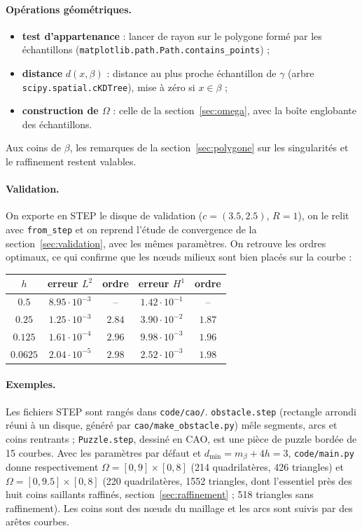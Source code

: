 \documentclass[11pt,a4paper]{article}
\begin{document}
\paragraph{Opérations géométriques.}
\begin{itemize}
  \item \textbf{test d'appartenance} : lancer de rayon sur le polygone formé
        par les échantillons (\texttt{matplotlib.path.Path.contains\_points}) ;
  \item \textbf{distance} $d(x, \beta)$ : distance au plus proche
        échantillon de $\gamma$ (arbre \texttt{scipy.spatial.cKDTree}),
        mise à zéro si $x \in \beta$ ;
  \item \textbf{construction de $\Omega$} : celle de la
        section~\ref{sec:omega}, avec la boîte englobante des échantillons.
\end{itemize}
Aux coins de $\beta$, les remarques de la section~\ref{sec:polygone} sur les
singularités et le raffinement restent valables.

\paragraph{Validation.} On exporte en STEP le disque de validation
($c = (3.5, 2.5)$, $R = 1$), on le relit avec \texttt{from\_step} et on
reprend l'étude de convergence de la section~\ref{sec:validation}, avec les
mêmes paramètres. On retrouve les ordres optimaux, ce qui confirme que les
nœuds milieux sont bien placés sur la courbe :
\begin{center}
\begin{tabular}{ccccc}
\hline
$h$ & erreur $L^2$ & ordre & erreur $H^1$ & ordre \\
\hline
$0.5$    & $8.95 \cdot 10^{-3}$ & --     & $1.42 \cdot 10^{-1}$ & --     \\
$0.25$   & $1.25 \cdot 10^{-3}$ & $2.84$ & $3.90 \cdot 10^{-2}$ & $1.87$ \\
$0.125$  & $1.61 \cdot 10^{-4}$ & $2.96$ & $9.98 \cdot 10^{-3}$ & $1.96$ \\
$0.0625$ & $2.04 \cdot 10^{-5}$ & $2.98$ & $2.52 \cdot 10^{-3}$ & $1.98$ \\
\hline
\end{tabular}
\end{center}

\paragraph{Exemples.} Les fichiers STEP sont rangés dans \texttt{code/cao/}.
\texttt{obstacle.step} (rectangle arrondi réuni à un disque, généré par
\texttt{cao/make\_obstacle.py}) mêle segments, arcs et coins rentrants ;
\texttt{Puzzle.step}, dessiné en CAO, est une pièce de puzzle bordée de 15
courbes. Avec les paramètres par défaut et $d_{\min} = m_\beta + 4h = 3$,
\texttt{code/main.py} donne respectivement $\Omega = [0, 9] \times [0, 8]$
(214 quadrilatères, 426 triangles) et $\Omega = [0, 9.5] \times [0, 8]$
(220 quadrilatères, 1552 triangles, dont l'essentiel près des huit coins
saillants raffinés, section~\ref{sec:raffinement} ; 518 triangles sans
raffinement). Les coins sont des nœuds du maillage et les arcs sont suivis
par des arêtes courbes.
\end{document}
